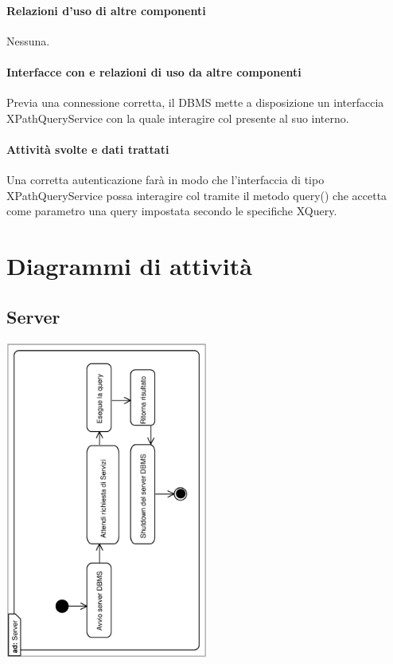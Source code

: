 \documentclass[11pt,titlepage,a4paper]{report}
\begin{document}
\subsubsection{Relazioni d'uso di altre componenti}
Nessuna.
\subsubsection{Interfacce con e relazioni di uso da altre componenti}
Previa una connessione corretta, il DBMS mette a disposizione un interfaccia XPathQueryService con la quale interagire col \re  presente al suo interno.
\subsubsection{Attivit\`a svolte e dati trattati}
Una corretta autenticazione far\`a in modo che l'interfaccia di tipo XPathQueryService possa interagire col \re tramite il metodo query() che accetta come parametro una query impostata secondo le specifiche XQuery.


\chapter{Diagrammi di attivit\`a}


\section{Server}

\begin{center}
 \includegraphics[width=0.5\textwidth, angle=-90]{Server.eps}
\end{center}
\end{document}
